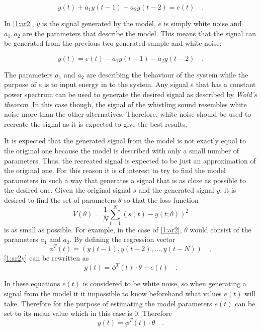 \documentclass{IEEEtran}
\begin{document}
\begin{equation}
  \label{1:ar2}
  y(t) + a_1 y(t-1) + a_2 y(t-2) = e(t) \quad .
\end{equation}

In \eqref{1:ar2}, $y$ is the signal generated by the model, $e$ is
simply white noise and $a_1, a_2$ are the parameters that describe the
model. This means that the signal can be generated from the previous two
generated sample and white noise:

\begin{equation}
  \label{1:ar2y}
  y(t) = e(t) - a_1 y(t-1) - a_2 y(t-2)\quad .
\end{equation}

The parameters $a_1$ and $a_2$ are describing the behaviour of the system
while the purpose of $e$ is to input energy in to the system. Any signal
$e$ that has a constant power spectrum can be used to generate the desired
signal as described by \textit{Wold's theorem}\cite{signalproc}. In this
case though, the signal of the whistling sound resembles white noise more
than the other alternatives. Therefore, white noise should be used to
recreate the signal as it is expected to give the best results.

It is expected that the generated signal from the model is not exactly
equal to the original one because the model is described with only a small
number of parameters. Thus, the recreated signal is expected to be just an
approximation of the original one. For this reason it is of interest to
try to find the model parameters in such a way that generates a signal
that is as close as possible to the desired one. Given the original signal
$s$ and the generated signal $y$, it is desired to find the set of
parameters $\theta$ so that the loss function
\begin{equation}
  \label{1:loss}
  V(\theta)  = \frac{1}{N}\sum_{t=1}^{N}(s(t) - y(t; \theta))^2
\end{equation}
is as small as possible. For example, in the case of \eqref{1:ar2},
$\theta$ would consist of the parameters $a_1$ and $a_2$. By defining
the regression vector
\begin{equation*}
  \phi^T(t) = (y(t-1), y(t-2), ... , y(t-N)) \quad ,
\end{equation*}
\eqref{1:ar2y} can be rewritten as
\begin{equation*}
  y(t) = \phi^T(t)\cdot\theta + e(t) \quad .
\end{equation*}

In these equations $e(t)$ is considered to be white noise, so when
generating a signal from the model it it impossible to know beforehand
what values $e(t)$ will take. Therefore for the purpose of estimating
the model parameters $e(t)$ can be set to its mean value which in this
case is $0$. Therefore
\begin{equation}
  \label{1:esty}
  y(t) = \phi^T(t)\cdot\theta \quad .
\end{equation}
\end{document}
